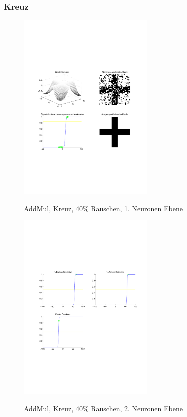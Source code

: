 \subsubsection{Kreuz}
\begin{figure}[hbt]
	\begin{minipage}[c]{\textwidth}
		\centering
       	\includegraphics[trim=71 213 43 212, clip, width=0.58\textwidth]{./Bilder/Auswertung/Endergebnis/TypeAddMul_Rauschen40_Cross_Layer1}
		\caption{AddMul, Kreuz, 40\% Rauschen, 1. Neuronen Ebene}
		\label{AddMul_Kreuz_40_1}
		\vfill
		\includegraphics[trim=71 213 43 212, clip, width=0.58\textwidth]{./Bilder/Auswertung/Endergebnis/TypeAddMul_Rauschen40_Cross_Layer2}
		\caption{AddMul, Kreuz, 40\% Rauschen, 2. Neuronen Ebene}
		\label{AddMul_Kreuz_40_2}
	\end{minipage}
\end{figure}

